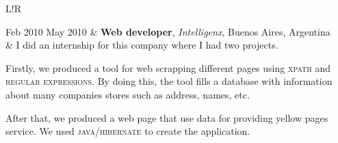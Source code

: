 \documentclass[10pt]{article}
\newcommand\VRule{\color{lightgray}\vrule width 0.5pt}
\begin{document}
\begin{tabular}{L!{\VRule}R}
	
	Feb 2010 May 2010 & \textbf{Web developer}, \textit{Intelligenx}, Buenos 
	Aires, Argentina\\
	& \vspace{-0.7cm} I did an internship for this company where I had two 
	projects.
	
	Firstly, we produced a tool for web scrapping different pages using
	\textsc{xpath} and \textsc{regular expressions}. By doing this, the tool 
	fills 
	a
	database with information about many companies stores such as address, 
	names, 
	etc.
	
	After that, we produced a web page that use data for providing yellow 
	pages service. We used \textsc{java/hibernate} to create the application. \\
\end{tabular}


%
%
%
\end{document}
